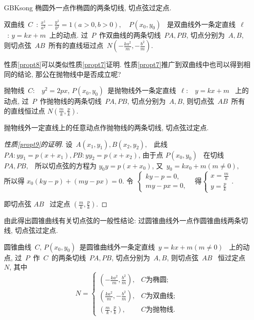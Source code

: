 \documentclass[a4paper, 12pt, twoside]{ctexart}
\begin{document}
\begin{CJK*}{GBK}{song}
椭圆外一点作椭圆的两条切线, 切点弦过定点.
    \begin{propt}\label{propt8}
        双曲线~$C$~: $\frac{x^1}{a^2}-\frac{y^1}{b^2}=1(a>0,  b>0),  \quad P(x_0, y_0)$~ 是双曲线外一条定直线~$\ell$~: $y=k x+m$~上的动点. 过~$P$~作双曲线的两条切线~$PA,PB$, 切点分别为~$A,B$, 则切点弦~$AB$~所有的直线垣过点~$N(-\frac{k a^2}{m}, -\frac{b^2}{m})$.
    \end{propt}

    性质\ref{propt8}可以类似性质\ref{propt7}证明. 性质\ref{propt7}推广到双曲线中也司以得到相同的结论, 那公在抛物线中是否成立呢?
    \begin{propt}\label{propt9}
        抛物线~$C:$~  $y^2 =2px$, $P(x_0, y_0)$~是抛物线外一条定直线~$\ell:$~  $y=kx+m$~ 上的动点, 过~$P$~作抛物线的两条切线~$PA,PB$, 切点分别为~$A,B$, 则切点弦~$AB$~所有的直线恒过点 $N(\frac{m}{k},  \frac{p}{k})$.
    \end{propt}
    \begin{rema}
        抛物线外一定直线上的任意动点作抛物线的两条切线, 切点弦过定点.
    \end{rema}
    \begin{proof}[性质\ref{propt9}的证明]
        设~$A(x_1, y_1), B(x_2,y_2),$~ 此线~$PA: y y_{1}=p\left(x+x_1\right),  P B:  y y_{2}=p\left(x+x_2\right)$, 由于点 $P(x_0, y_0)$~ 在切线 $P A,  P B, $~ 所以切点弦的方程为 $y_0 y=p(x+x_0)$, 又~$y_0=k x_0+m(m \neq 0), $~ 所以得 $x_0(k y-p)+(m y-p x)=0$. 令~$\begin{cases}k y-p=0, \\[-5pt] m y-p x=0,\end{cases}$~ 得$\begin{cases}x=\frac{m}{k} \\[-5pt] y=\frac{p}{k}\end{cases}.$~
\par 即切点弦 $A B$~ 过定点 $\left(\frac{m}{k},  \frac{p}{k}\right)$.
    \end{proof}

    由此得出圆锥曲线有关切点弦的一般性结论: 过圆锥曲线外一点作圆锥曲线两条切线, 切点弦过定点.
    \begin{coro}\label{coro3}
        圆锥曲线~$C$, $P(x_0,y_0)$~是圆锥曲线外一条定直线~$y=kx+m(m\ne0)$~ 上的动点,  过~$P$~作~$C$~的两条切线~$PA,PB$, 切点分别为~$A,B$, 则切点弦~$AB$~ 恒过定点~$N$, 其中
        $$~N=\begin{cases}
            (-\frac{k a^2}{m},  \frac{b^2}{m}),&C\text{为椭圆};\\
            (\frac{ka^2}{m}, -\frac{b^2}{m}),&C\text{为双曲线};\\
            (\frac{m}{k},\frac{p}{k}),&C\text{为抛物线}.
        \end{cases}~$$~
    \end{coro}


\end{CJK*}
\end{document}
